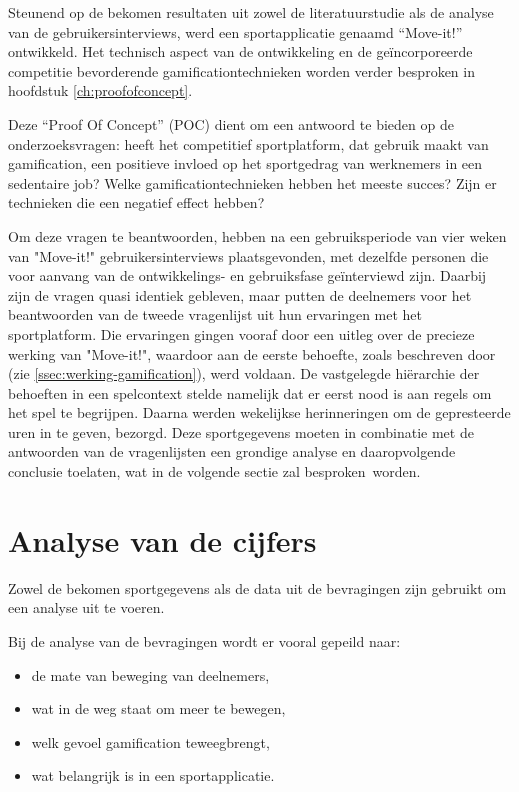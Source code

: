 Steunend op de bekomen resultaten uit zowel de literatuurstudie als de analyse van de gebruikersinterviews, werd een sportapplicatie genaamd ``Move-it!'' ontwikkeld. Het technisch aspect van de ontwikkeling en de geïncorporeerde competitie bevorderende gamificationtechnieken worden verder besproken in hoofdstuk \ref{ch:proofofconcept}.

Deze ``Proof Of Concept'' (POC) dient om een antwoord te bieden op de onderzoeksvragen: heeft het competitief sportplatform, dat gebruik maakt van gamification, een positieve invloed op het sportgedrag van werknemers in een sedentaire job? Welke gamificationtechnieken hebben het meeste succes? Zijn er technieken die een negatief effect hebben?

Om deze vragen te beantwoorden, hebben na een gebruiksperiode van vier weken van "Move-it!" gebruikersinterviews plaatsgevonden, met dezelfde personen die voor aanvang van de ontwikkelings- en gebruiksfase geïnterviewd zijn.
Daarbij zijn de vragen quasi identiek gebleven, maar putten de deelnemers voor het beantwoorden van de tweede vragenlijst uit hun ervaringen met het sportplatform. Die ervaringen gingen vooraf door een uitleg over de precieze werking van "Move-it!", waardoor aan de eerste behoefte, zoals beschreven door \textcite{Siang2003} (zie \ref{ssec:werking-gamification}), werd voldaan. De vastgelegde hiërarchie der behoeften in een spelcontext stelde namelijk dat er eerst nood is aan regels om het spel te begrijpen. Daarna werden wekelijkse herinneringen om de gepresteerde uren in te geven, bezorgd. Deze sportgegevens moeten in combinatie met de antwoorden van de vragenlijsten een grondige analyse en daaropvolgende conclusie toelaten, wat in de volgende sectie zal besproken worden.

\section{Analyse van de cijfers}

Zowel de bekomen sportgegevens als de data uit de bevragingen zijn gebruikt om een analyse uit te voeren.

Bij de analyse van de bevragingen wordt er vooral gepeild naar:
\begin{itemize}
    \item de mate van beweging van deelnemers,
    \item wat in de weg staat om meer te bewegen,
    \item welk gevoel gamification teweegbrengt,
    \item wat belangrijk is in een sportapplicatie.
\end{itemize}

